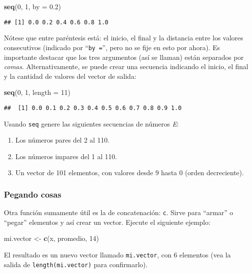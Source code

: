 \documentclass[]{article}
\newenvironment{Shaded}{}{}
\newcommand{\KeywordTok}[1]{\textcolor[rgb]{0.00,0.44,0.13}{\textbf{{#1}}}}
\newcommand{\DataTypeTok}[1]{\textcolor[rgb]{0.56,0.13,0.00}{{#1}}}
\newcommand{\DecValTok}[1]{\textcolor[rgb]{0.25,0.63,0.44}{{#1}}}
\newcommand{\FloatTok}[1]{\textcolor[rgb]{0.25,0.63,0.44}{{#1}}}
\newcommand{\NormalTok}[1]{{#1}}
\begin{document}
\begin{Shaded}
\begin{Highlighting}[]
\KeywordTok{seq}\NormalTok{(}\DecValTok{0}\NormalTok{, }\DecValTok{1}\NormalTok{, }\DataTypeTok{by =} \FloatTok{0.2}\NormalTok{)}
\end{Highlighting}
\end{Shaded}
\begin{verbatim}
## [1] 0.0 0.2 0.4 0.6 0.8 1.0
\end{verbatim}
Nótese que entre paréntesis está: el inicio, el final y la distancia
entre los valores consecutivos (indicado por ``\texttt{by =}'', pero no
se fije en esto por ahora). Es importante destacar que los tres
argumentos (así se llaman) están separados por \emph{comas}.
Alternativamente, se puede crear una secuencia indicando el inicio, el
final y la cantidad de valores del vector de salida:

\begin{Shaded}
\begin{Highlighting}[]
\KeywordTok{seq}\NormalTok{(}\DecValTok{0}\NormalTok{, }\DecValTok{1}\NormalTok{, }\DataTypeTok{length =} \DecValTok{11}\NormalTok{)}
\end{Highlighting}
\end{Shaded}
\begin{verbatim}
##  [1] 0.0 0.1 0.2 0.3 0.4 0.5 0.6 0.7 0.8 0.9 1.0
\end{verbatim}
Usando \texttt{seq} genere las siguientes secuencias de números
\emph{E}:

\begin{enumerate}[1.]
\item
  Los números pares del 2 al 110.
\item
  Los números impares del 1 al 110.
\item
  Un vector de 101 elementos, con valores desde 9 hasta 0 (orden
  decreciente).
\end{enumerate}
\subsubsection{Pegando cosas}

Otra función sumamente útil es la de concatenación: \texttt{c}. Sirve
para ``armar'' o ``pegar'' elementos y así crear un vector. Ejecute el
siguiente ejemplo:

\begin{Shaded}
\begin{Highlighting}[]
\NormalTok{mi.vector <- }\KeywordTok{c}\NormalTok{(x, promedio, }\DecValTok{14}\NormalTok{)}
\end{Highlighting}
\end{Shaded}
El resultado es un nuevo vector llamado \texttt{mi.vector}, con 6
elementos (vea la salida de \texttt{length(mi.vector)} para
confirmarlo).
\end{document}
